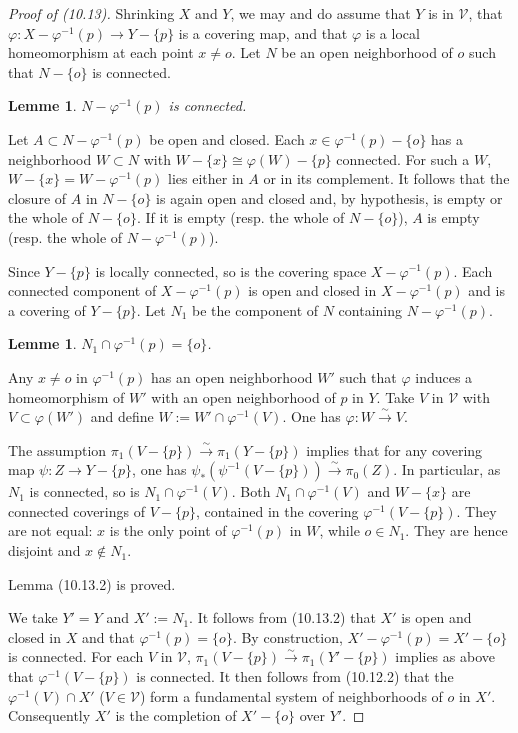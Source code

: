 \documentclass[12pt,a4paper]{article}
\theoremstyle{plain}
\newtheorem{lemma}[theorem]{Lemme}
\theoremstyle{definition}
\theoremstyle{remark}
\begin{document}
\begin{proof}[Proof of (10.13)]
Shrinking $X$ and $Y$, we may and do assume that $Y$ is in $\mathscr{V}$, that $\varphi : X - \varphi^{-1}(p) \to Y - \{p\}$ is a covering map, and that $\varphi$ is a local homeomorphism at each point $x \neq o$. Let $N$ be an open neighborhood of $o$ such that $N - \{o\}$ is connected.

\begin{lemma}
\label{10.13.1}
$N - \varphi^{-1}(p)$ is connected.
\end{lemma}

Let $A \subset N - \varphi^{-1}(p)$ be open and closed. Each $x \in \varphi^{-1}(p) - \{o\}$ has a neighborhood $W \subset N$ with $W - \{x\} \cong \varphi(W) - \{p\}$ connected. For such a $W$, $W - \{x\} = W - \varphi^{-1}(p)$ lies either in $A$ or in its complement. It follows that the closure of $A$ in $N - \{o\}$ is again open and closed and, by hypothesis, is empty or the whole of $N - \{o\}$. If it is empty (resp. the whole of $N - \{o\}$), $A$ is empty (resp. the whole of $N - \varphi^{-1}(p)$).

Since $Y - \{p\}$ is locally connected, so is the covering space $X - \varphi^{-1}(p)$. Each connected component of $X - \varphi^{-1}(p)$ is open and closed in $X - \varphi^{-1}(p)$ and is a covering of $Y - \{p\}$. Let $N_1$ be the component of $N$ containing $N - \varphi^{-1}(p)$.

\begin{lemma}
\label{10.13.2}
$N_1 \cap \varphi^{-1}(p) = \{o\}$.
\end{lemma}

Any $x \neq o$ in $\varphi^{-1}(p)$ has an open neighborhood $W'$ such that $\varphi$ induces a homeomorphism of $W'$ with an open neighborhood of $p$ in $Y$. Take $V$ in $\mathscr{V}$ with $V \subset \varphi(W')$ and define $W := W' \cap \varphi^{-1}(V)$. One has $\varphi : W \xrightarrow{\sim} V$.

The assumption $\pi_1(V - \{p\}) \xrightarrow{\sim} \pi_1(Y - \{p\})$ implies that for any covering map $\psi : Z \to Y - \{p\}$, one has $\psi_*(\psi^{-1}(V - \{p\})) \xrightarrow{\sim} \pi_0(Z)$. In particular, as $N_1$ is connected, so is $N_1 \cap \varphi^{-1}(V)$. Both $N_1 \cap \varphi^{-1}(V)$ and $W - \{x\}$ are connected coverings of $V - \{p\}$, contained in the covering $\varphi^{-1}(V - \{p\})$. They are not equal: $x$ is the only point of $\varphi^{-1}(p)$ in $W$, while $o \in N_1$. They are hence disjoint and $x \notin N_1$.

Lemma (10.13.2) is proved.

We take $Y' = Y$ and $X' := N_1$. It follows from (10.13.2) that $X'$ is open and closed in $X$ and that $\varphi^{-1}(p) = \{o\}$. By construction, $X' - \varphi^{-1}(p) = X' - \{o\}$ is connected. For each $V$ in $\mathscr{V}$, $\pi_1(V - \{p\}) \xrightarrow{\sim} \pi_1(Y' - \{p\})$ implies as above that $\varphi^{-1}(V - \{p\})$ is connected. It then follows from (10.12.2) that the $\varphi^{-1}(V) \cap X'$ ($V \in \mathscr{V}$) form a fundamental system of neighborhoods of $o$ in $X'$. Consequently $X'$ is the completion of $X' - \{o\}$ over $Y'$.
\end{proof}
\end{document}
